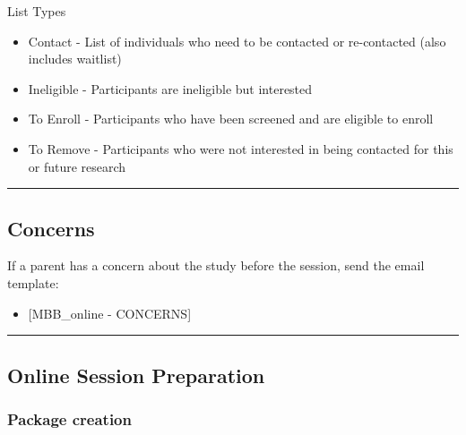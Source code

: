 \documentclass[]{book}
\providecommand{\tightlist}{%
  \setlength{\itemsep}{0pt}\setlength{\parskip}{0pt}}
\begin{document}
List Types

\begin{itemize}
\tightlist
\item
  Contact - List of individuals who need to be contacted or re-contacted (also includes waitlist)
\item
  Ineligible - Participants are ineligible but interested
\item
  To Enroll - Participants who have been screened and are eligible to enroll
\item
  To Remove - Participants who were not interested in being contacted for this or future research
\end{itemize}

\begin{center}\rule{0.5\linewidth}{0.5pt}\end{center}

\hypertarget{concerns}{%
\subsection{Concerns}\label{concerns}}

If a parent has a concern about the study before the session, send the email template:

\begin{itemize}
\tightlist
\item
  {[}MBB\_online - CONCERNS{]}
\end{itemize}

\begin{center}\rule{0.5\linewidth}{0.5pt}\end{center}

\hypertarget{online-session-preparation}{%
\subsection{Online Session Preparation}\label{online-session-preparation}}

\hypertarget{package-creation}{%
\subsubsection{Package creation}\label{package-creation}}
\end{document}
